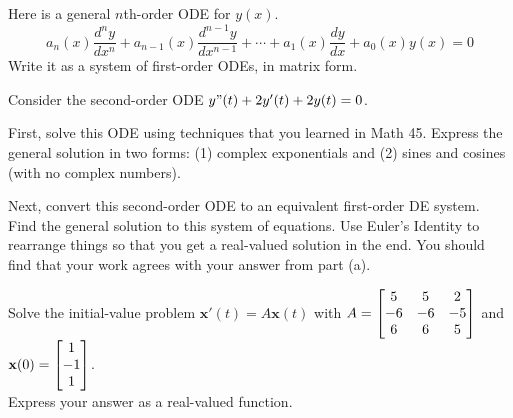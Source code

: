 \documentclass[boxes]{gsypset}
\begin{document}
	\begin{problem}
		Here is a general $n$th-order ODE for $y(x)$.
		\[
			a_n(x)\frac{d^ny}{dx^n} +
			a_{n-1}(x)\frac{d^{n-1}y}{dx^{n-1}} +
			\cdots+a_1(x)\frac{dy}{dx} +
			a_0(x)y(x)
			= 0
		\]
		Write it as a system of first-order ODEs, in matrix form.
	\end{problem}
	\begin{solution}
		
	\end{solution}
	
	\begin{problem}
		Consider the second-order ODE $y"(t)+2y'(t)+2y(t)=0$.
		\begin{subproblems}
			\subproblem
				First, solve this ODE using techniques that you learned in Math 45. 
				Express the general solution in two forms: 
					(1) complex exponentials and 
					(2) sines and cosines (with no complex numbers).
				\begin{solution}
					
				\end{solution}
			\subproblem
				Next, convert this second-order ODE to an equivalent first-order DE system. 
				Find the general solution to this system of equations. 
				Use Euler's Identity to rearrange things so that you get a real-valued solution in the end. 
				You should find that your work agrees with your answer from part (a).
				\begin{solution}
					
				\end{solution}
		\end{subproblems}
	\end{problem}
	
	\begin{problem}
		Solve the initial-value problem $\mathbf{x}'(t)=A\mathbf{x}(t)$
	  with $A = \begin{bmatrix}5 & 5 & 2 \\ -6 & -6 & -5 \\ 6 & 6 & 5\end{bmatrix}$ and
		$\mathbf{x}(0) = \begin{bmatrix}1 \\ -1 \\ 1\end{bmatrix}$.\\
		Express your answer as a real-valued function.
	\end{problem}
	\begin{solution}
		
	\end{solution}
	
\end{document}
